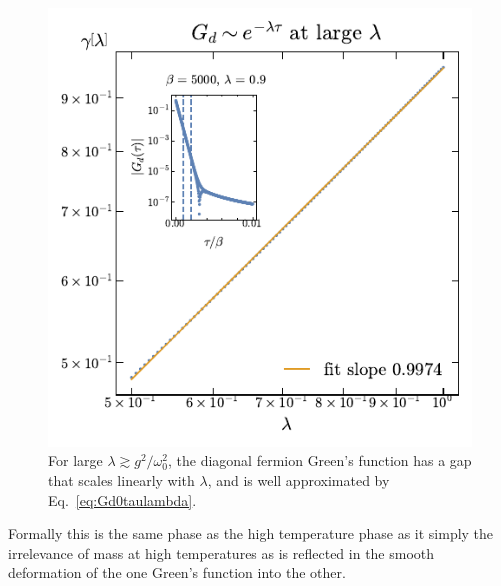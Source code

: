 \begin{figure}
    \centering
    \includegraphics[width=0.8\linewidth]{figures/chapter3/LARGElambdalinearscaling.pdf}
    \caption{For large $\lambda \gtrsim g^{2}/\omega_0^2$, 
    the diagonal fermion Green's function has a gap that scales linearly with $\lambda$, and is well approximated by Eq.~\ref{eq:Gd0taulambda}.}
    \label{fig:LargeLambdaGapScaling}
\end{figure}
%
Formally this is the same phase as the high temperature phase as it simply the irrelevance of mass at high temperatures as is reflected in the smooth deformation of the one Green's function into the other. 

